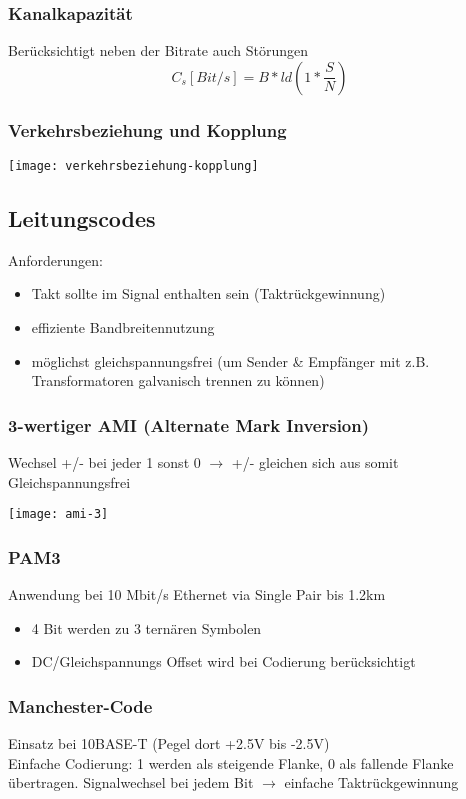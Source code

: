 \subsubsection{Kanalkapazität}
Berücksichtigt neben der Bitrate auch Störungen
$$C_s [Bit/s] = B * ld(1 * \frac{S}{N})$$

\subsubsection{Verkehrsbeziehung und Kopplung}
\begin{center}
    \texttt{[image: verkehrsbeziehung-kopplung]}
\end{center}

\subsection{Leitungscodes}
Anforderungen:
\begin{itemize}
    \item Takt sollte im Signal enthalten sein (Taktrückgewinnung)
    \item effiziente Bandbreitennutzung
    \item möglichst gleichspannungsfrei (um Sender \& Empfänger mit z.B.
          Transformatoren galvanisch trennen zu können)
\end{itemize}


\subsubsection{3-wertiger AMI (Alternate Mark Inversion)}
Wechsel +/- bei jeder 1 sonst 0 $\rightarrow$ +/- gleichen sich aus
somit Gleichspannungsfrei
\begin{center}
    \texttt{[image: ami-3]}
\end{center}

\subsubsection{PAM3}
Anwendung bei 10 Mbit/s Ethernet via Single Pair bis 1.2km
\begin{itemize}
    \item 4 Bit werden zu 3 ternären Symbolen
    \item DC/Gleichspannungs Offset wird bei Codierung berücksichtigt
\end{itemize}

\subsubsection{Manchester-Code}
Einsatz bei 10BASE-T (Pegel dort +2.5V bis -2.5V)\\
Einfache Codierung: 1 werden als steigende Flanke, 0 als fallende Flanke übertragen.
Signalwechsel bei jedem Bit $\rightarrow$ einfache Taktrückgewinnung

